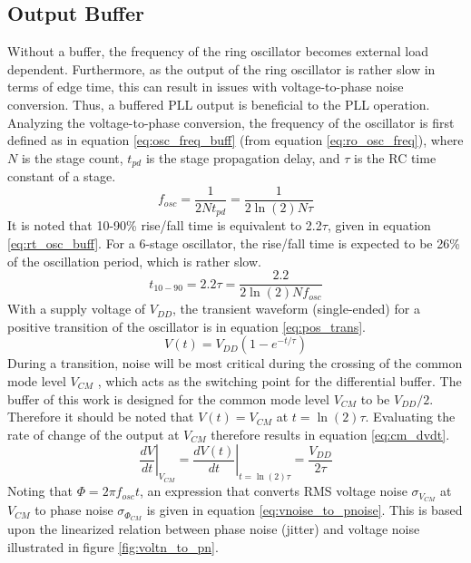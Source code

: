 	\FloatBarrier
	\vspace{-2em}
	\subsection{Output Buffer}\label{sec:buffer}
		Without a buffer, the frequency of the ring oscillator becomes external load dependent. Furthermore, as the output of the ring oscillator is rather slow in terms of edge time, this can result in issues with voltage-to-phase noise conversion. Thus, a buffered PLL output is beneficial to the PLL operation. Analyzing the voltage-to-phase conversion, the frequency of the oscillator is first defined as in equation \ref{eq:osc_freq_buff} (from equation \ref{eq:ro_osc_freq}), where $N$ is the stage count, $t_{pd}$ is the stage propagation delay, and $\tau$ is the RC time constant of a stage. 
		\begin{equation}\label{eq:osc_freq_buff}
			f_{osc} = \frac{1}{2N t_{pd}} = \frac{1}{2\ln(2)N \tau}
		\end{equation}
		It is noted that 10-90\% rise/fall time is equivalent to 2.2$\tau$, given in equation \ref{eq:rt_osc_buff}. For a 6-stage oscillator, the rise/fall time is expected to be 26\% of the oscillation period, which is rather slow.
		\begin{equation}\label{eq:rt_osc_buff}
			t_{10-90} = 2.2\tau =  \frac{2.2}{2\ln(2)N f_{osc}}
		\end{equation}		
		With a supply voltage of $V_{DD}$, the transient waveform (single-ended) for a positive transition of the oscillator is in equation \ref{eq:pos_trans}.
		\begin{equation}\label{eq:pos_trans}
			V(t) =V_{DD}\left( 1 - e^{-t/\tau} \right)
		\end{equation}		
		During a transition, noise will be most critical during the crossing of the common mode level $V_{CM}$ , which acts as the switching point for the differential buffer. The buffer of this work is designed for the common mode level $V_{CM}$ to be $V_{DD}/2$. Therefore it should be noted that $V(t) = V_{CM}$ at $t = \ln(2)\tau$. Evaluating the rate of change of the output at $V_{CM}$ therefore results in equation \ref{eq:cm_dvdt}.
		\begin{equation}\label{eq:cm_dvdt}
			\left.\frac{dV}{dt}\right|_{V_{CM}} = \left.\frac{dV(t)}{dt}\right|_{t= \ln(2)\tau} = \frac{V_{DD}}{2\tau}
		\end{equation}	
		Noting that $\Phi = 2\pi f_{osc}t$, an expression that converts RMS voltage noise $\sigma_{V_{CM}}$ at $V_{CM}$ to phase noise $\sigma_{\Phi_{CM}}$ is given in equation \ref{eq:vnoise_to_pnoise}. This is based upon the linearized relation between phase noise (jitter) and voltage noise illustrated in figure \ref{fig:voltn_to_pn}.
